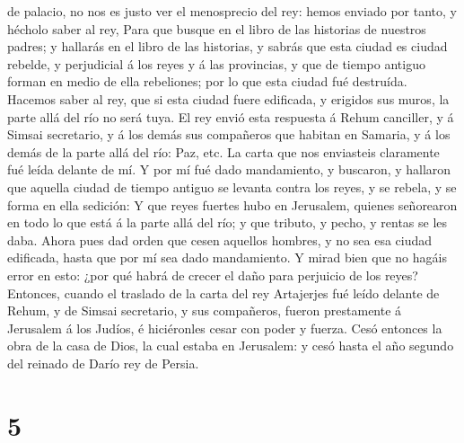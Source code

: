 de palacio, no nos es justo ver el menosprecio del rey: hemos enviado
por tanto, y hécholo saber al rey,  Para que busque en el
libro de las historias de nuestros padres; y hallarás en el libro de las
historias, y sabrás que esta ciudad es ciudad rebelde, y perjudicial á
los reyes y á las provincias, y que de tiempo antiguo forman en medio de
ella rebeliones; por lo que esta ciudad fué destruída. 
Hacemos saber al rey, que si esta ciudad fuere edificada, y erigidos sus
muros, la parte allá del río no será tuya.  El rey envió
esta respuesta á Rehum canciller, y á Simsai secretario, y á los demás
sus compañeros que habitan en Samaria, y á los demás de la parte allá
del río: Paz, etc.  La carta que nos enviasteis
claramente fué leída delante de mí.  Y por mí fué dado
mandamiento, y buscaron, y hallaron que aquella ciudad de tiempo antiguo
se levanta contra los reyes, y se rebela, y se forma en ella sedición:
 Y que reyes fuertes hubo en Jerusalem, quienes
señorearon en todo lo que está á la parte allá del río; y que tributo, y
pecho, y rentas se les daba.  Ahora pues dad orden que
cesen aquellos hombres, y no sea esa ciudad edificada, hasta que por mí
sea dado mandamiento.  Y mirad bien que no hagáis error
en esto: ¿por qué habrá de crecer el daño para perjuicio de los reyes?
 Entonces, cuando el traslado de la carta del rey
Artajerjes fué leído delante de Rehum, y de Simsai secretario, y sus
compañeros, fueron prestamente á Jerusalem á los Judíos, é hiciéronles
cesar con poder y fuerza.  Cesó entonces la obra de la
casa de Dios, la cual estaba en Jerusalem: y cesó hasta el año segundo
del reinado de Darío rey de Persia.

\hypertarget{section-4}{%
\section{5}\label{section-4}}

